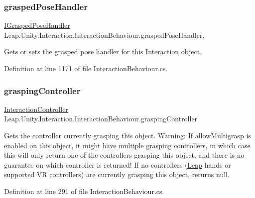 \subsubsection{\texorpdfstring{graspedPoseHandler}{graspedPoseHandler}}
{\footnotesize\ttfamily \mbox{\hyperlink{interface_leap_1_1_unity_1_1_interaction_1_1_i_grasped_pose_handler}{I\+Grasped\+Pose\+Handler}} Leap.\+Unity.\+Interaction.\+Interaction\+Behaviour.\+grasped\+Pose\+Handler\hspace{0.3cm}{\ttfamily [get]}, {\ttfamily [set]}}



Gets or sets the grasped pose handler for this \mbox{\hyperlink{namespace_leap_1_1_unity_1_1_interaction}{Interaction}} object. 



Definition at line 1171 of file Interaction\+Behaviour.\+cs.

\mbox{\label{class_leap_1_1_unity_1_1_interaction_1_1_interaction_behaviour_a7da6b3f9bc72ed337ccc2136035dd08f}} 
\subsubsection{\texorpdfstring{graspingController}{graspingController}}
{\footnotesize\ttfamily \mbox{\hyperlink{class_leap_1_1_unity_1_1_interaction_1_1_interaction_controller}{Interaction\+Controller}} Leap.\+Unity.\+Interaction.\+Interaction\+Behaviour.\+grasping\+Controller\hspace{0.3cm}{\ttfamily [get]}}



Gets the controller currently grasping this object. Warning\+: If allow\+Multigrasp is enabled on this object, it might have multiple grasping controllers, in which case this will only return one of the controllers grasping this object, and there is no guarantee on which controller is returned! If no controllers (\mbox{\hyperlink{namespace_leap_1_1_unity_1_1_leap}{Leap}} hands or supported VR controllers) are currently grasping this object, returns null. 



Definition at line 291 of file Interaction\+Behaviour.\+cs.

